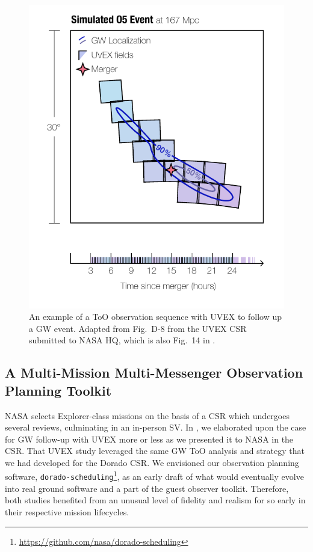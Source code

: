 \documentclass[twocolumn,times]{aastex631}
\begin{document}
\begin{figure}
    \includegraphics[width=\columnwidth]{figures/uvex-tiling}
    \caption{\label{fig:uvex-tiling}An example of a \ac{ToO} observation sequence with \ac{UVEX} to follow up a \ac{GW} event. Adapted from Fig.~D-8 from the \ac{UVEX} \ac{CSR} submitted to NASA \ac{HQ}, which is also Fig.~14 in \citet{2021arXiv211115608K}.}
\end{figure}

\subsection{A Multi-Mission Multi-Messenger Observation Planning Toolkit}

NASA selects Explorer-class missions on the basis of a \acf{CSR} which undergoes several reviews, culminating in an in-person \ac{SV}. In \citet{2025arXiv250114109C}, we elaborated upon the case for \ac{GW} follow-up with \ac{UVEX} more or less as we presented it to NASA in the \ac{CSR}. That \ac{UVEX} study leveraged the same \ac{GW} \ac{ToO} analysis and strategy that we had developed for the Dorado \ac{CSR}. We envisioned our observation planning software, \texttt{dorado-scheduling}\footnote{\url{https://github.com/nasa/dorado-scheduling}}, as an early draft of what would eventually evolve into real ground software and a part of the guest observer toolkit. Therefore, both studies benefited from an unusual level of fidelity and realism for so early in their respective mission lifecycles.
\end{document}
